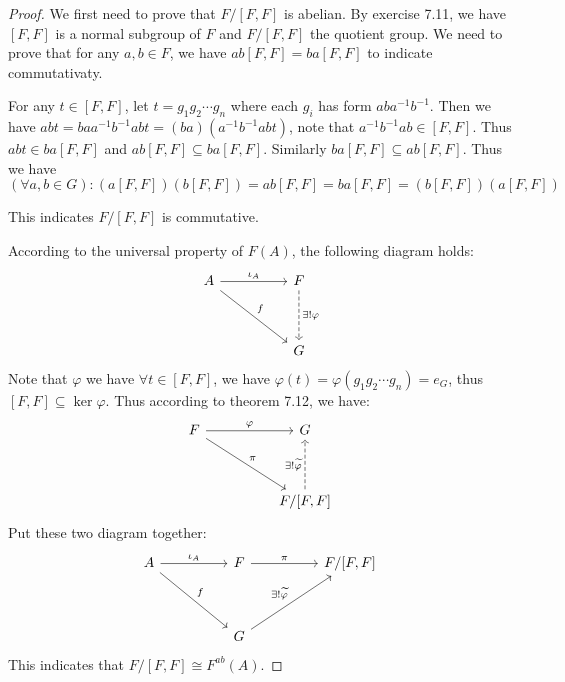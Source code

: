 \documentclass[a4paper, pdf, 12pt]{article}
\begin{document}
\begin{proof}
  We first need to prove that $F/[F, F]$ is abelian. By exercise 7.11, we have 
  $[F,F]$ is a normal subgroup of $F$ and $F/[F, F]$ the quotient group. 
  We need to prove that for any $a,b\in F$, we have $ab[F, F] = ba[F, F]$ to indicate commutativaty.

  For any $t\in [F, F]$, let $t = g_1g_2\cdots g_{n}$ where each $g_{i}$ has form $aba^{-1}b^{-1}$. 
  Then we have $abt = baa^{-1}b^{-1}abt = (ba)(a^{-1}b^{-1}abt)$, note that $a^{-1}b^{-1}ab\in [F,F]$. 
  Thus $abt\in ba[F, F]$ and $ab[F, F]\subseteq ba[F, F]$. Similarly $ba[F, F]\subseteq ab[F, F]$. Thus we 
  have $$
  (\forall a,b\in G): (a[F,F])(b[F,F]) = ab[F,F] = ba[F,F] = (b[F,F])(a[F,F])
  $$

  \noindent
  This indicates $F/[F, F]$ is commutative.

  According to the universal property of $F(A)$, the following diagram holds:
  $$
  \begin{tikzcd}[column sep = huge, row sep = huge]
    A \ar[rd, "f"] \ar[r, "\iota_{A}"]& F\ar[d, dashed, "\exists !\varphi"] \\
      & G
  \end{tikzcd}
  $$
  Note that $\varphi$ we have $\forall t\in [F, F]$, we have 
  $\varphi(t) = \varphi(g_1g_2\cdots g_{n}) = e_{G}$, thus $[F, F]\subseteq \ker \varphi$.
  Thus according to theorem 7.12, we have:
  $$
  \begin{tikzcd}[column sep = huge, row sep = huge]
    F \ar[r, "\varphi"] \ar[rd, "\pi"] & G\\
      & F/[F, F] \ar[u, dashed, "\exists!\widetilde{\varphi}"]
  \end{tikzcd}
  $$
  Put these two diagram together:
  $$
  \begin{tikzcd}[column sep = huge, row sep = huge]
    A \ar[rd, "f"]\ar[r, "\iota_{A}"] & F \ar[r, "\pi"]& F/[F, F]\\
      & G \ar[ur, "\exists!\widetilde{\varphi}"] &
  \end{tikzcd}
  $$
  This indicates that $F/[F, F]\cong F^{ab}(A)$.
\end{proof}
\end{document}

